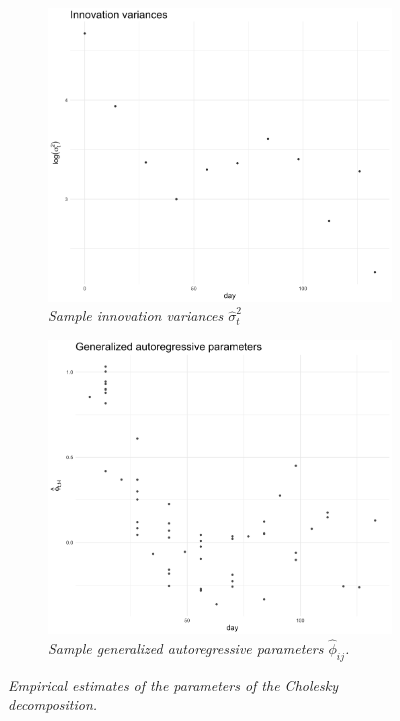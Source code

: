 \begin{figure}[H]
 \begin{subfigure}[t]{.48\textwidth}
  \centering
    \includegraphics[width=\textwidth]{img/cattle/cattleA-innovation-variogram}
 \caption{\textit{Sample innovation variances $\hat{\sigma}_t^2$}} \label{fig:cattleA-innovation-variogram}
 \end{subfigure}
 \begin{subfigure}[t]{.48\textwidth}
  \centering
\includegraphics[width = \textwidth]{img/cattle/cattleA-regressogram}
 \caption{\textit{Sample generalized autoregressive parameters $\hat{\phi}_{ij}$.}}
\label{fig:cattleA-regressogram}
 \end{subfigure}
 \caption{\textit{Empirical estimates of the parameters of the Cholesky decomposition.}} \label{fig:cattleA-innovation-variogram-and-regressogram}
\end{figure}

